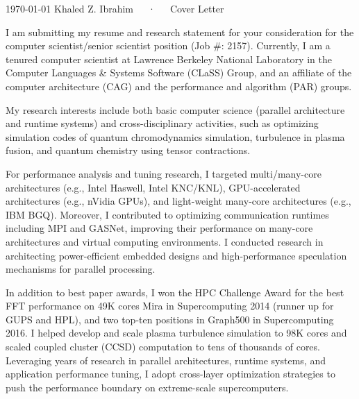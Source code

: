 \documentclass[11pt, letterpaper]{awesome-cv}
\begin{document}
\makecvheader[R]

\makecvfooter
  {\today}
  {Khaled Z. Ibrahim~~~·~~~Cover Letter}
  {}

\makelettertitle

\begin{cvletter}

I am submitting my resume and research statement for your consideration for the 
computer scientist/senior scientist position (Job \#: 2157).
Currently, I am a tenured computer scientist at Lawrence Berkeley
National Laboratory in the Computer Languages \& Systems Software
(CLaSS) Group,  and an affiliate of the computer architecture (CAG) and the
performance and algorithm (PAR) groups.

My research interests include both basic computer science (parallel
architecture and runtime systems) and  
cross-disciplinary activities, such as optimizing simulation codes of quantum chromodynamics
simulation, turbulence in plasma
fusion, and  quantum chemistry using tensor contractions. 

For performance analysis and
tuning research, I targeted multi/many-core architectures (e.g., Intel Haswell, Intel KNC/KNL),
GPU-accelerated architectures (e.g., nVidia GPUs), and light-weight
many-core architectures (e.g., IBM BGQ). 
Moreover, I  contributed to optimizing communication runtimes including
MPI and GASNet,  improving their performance on many-core architectures and virtual computing
environments. I conducted research in
architecting power-efficient embedded designs and high-performance
speculation mechanisms for parallel processing.

In addition to best paper awards, I won the HPC Challenge Award for the best FFT performance on 49K cores
Mira in Supercomputing 2014 (runner up for GUPS and HPL),  and two
top-ten positions in Graph500 in
Supercomputing 2016. I helped develop and 
scale plasma turbulence simulation to 98K cores and scaled coupled cluster
(CCSD) computation to tens of thousands of cores. 
Leveraging years of research in parallel architectures, runtime systems, and application
performance tuning, I adopt cross-layer optimization strategies to push the performance
boundary on extreme-scale   supercomputers.  


\end{cvletter}
\end{document}
